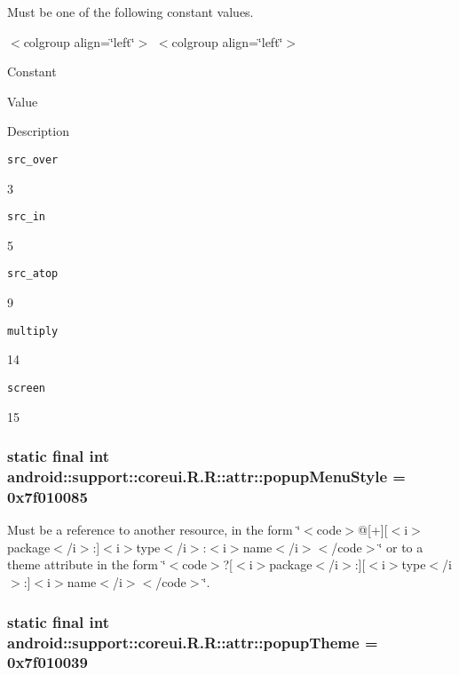 Must be one of the following constant values. \begin{TabularC}{0}
\hline
\end{TabularC}
$<$colgroup align=\char`\"{}left\char`\"{}$>$ $<$colgroup align=\char`\"{}left\char`\"{}$>$ 

Constant

Value

Description 

{\tt src\_\-over}

3

{\tt src\_\-in}

5

{\tt src\_\-atop}

9

{\tt multiply}

14

{\tt screen}

15\hypertarget{classandroid_1_1support_1_1coreui_1_1_r_1_1attr_e12f86beb29606a0e490e8b5a8c6a370}{
\subsubsection[{popupMenuStyle}]{\setlength{\rightskip}{0pt plus 5cm}static final int android::support::coreui.R.R::attr::popupMenuStyle = 0x7f010085}}
\label{classandroid_1_1support_1_1coreui_1_1_r_1_1attr_e12f86beb29606a0e490e8b5a8c6a370}


Must be a reference to another resource, in the form \char`\"{}$<$code$>$@\mbox{[}+\mbox{]}\mbox{[}$<$i$>$package$<$/i$>$:\mbox{]}$<$i$>$type$<$/i$>$:$<$i$>$name$<$/i$>$$<$/code$>$\char`\"{} or to a theme attribute in the form \char`\"{}$<$code$>$?\mbox{[}$<$i$>$package$<$/i$>$:\mbox{]}\mbox{[}$<$i$>$type$<$/i$>$:\mbox{]}$<$i$>$name$<$/i$>$$<$/code$>$\char`\"{}. \hypertarget{classandroid_1_1support_1_1coreui_1_1_r_1_1attr_9e782c1d1ecf63f50c340bf0f34b0e78}{
\subsubsection[{popupTheme}]{\setlength{\rightskip}{0pt plus 5cm}static final int android::support::coreui.R.R::attr::popupTheme = 0x7f010039}}
\label{classandroid_1_1support_1_1coreui_1_1_r_1_1attr_9e782c1d1ecf63f50c340bf0f34b0e78}


